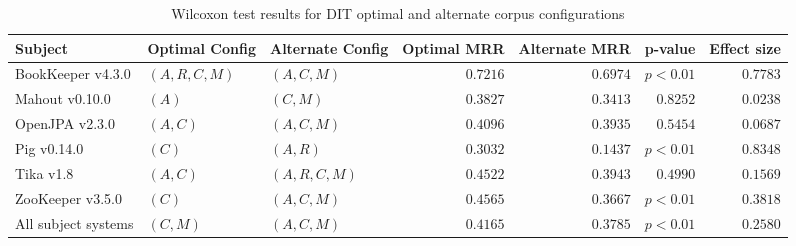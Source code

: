 
\begin{landscape}
\begin{table}
\begin{spacing}{1.2}
\centering
\caption{Wilcoxon test results for DIT optimal and alternate corpus configurations}
\label{table:combo-dit-corpus-sweep-wilcox}
\begin{tabular}{lllrrrr}
\toprule
                      Subject &  Optimal Config & Alternate Config & Optimal MRR & Alternate MRR &  p-value & Effect size \\
\midrule
            BookKeeper v4.3.0 &  $(A, R, C, M)$ &      $(A, C, M)$ &    $0.7216$ &      $0.6974$ & $p<0.01$ &    $0.7783$ \\
               Mahout v0.10.0 &           $(A)$ &         $(C, M)$ &    $0.3827$ &      $0.3413$ & $0.8252$ &    $0.0238$ \\
               OpenJPA v2.3.0 &        $(A, C)$ &      $(A, C, M)$ &    $0.4096$ &      $0.3935$ & $0.5454$ &    $0.0687$ \\
                  Pig v0.14.0 &           $(C)$ &         $(A, R)$ &    $0.3032$ &      $0.1437$ & $p<0.01$ &    $0.8348$ \\
                    Tika v1.8 &        $(A, C)$ &   $(A, R, C, M)$ &    $0.4522$ &      $0.3943$ & $0.4990$ &    $0.1569$ \\
             ZooKeeper v3.5.0 &           $(C)$ &      $(A, C, M)$ &    $0.4565$ &      $0.3667$ & $p<0.01$ &    $0.3818$ \\
 \midrule
All subject systems &        $(C, M)$ &      $(A, C, M)$ &    $0.4165$ &      $0.3785$ & $p<0.01$ &    $0.2580$ \\
\bottomrule
\end{tabular}

\end{spacing}
\end{table}
\end{landscape}
